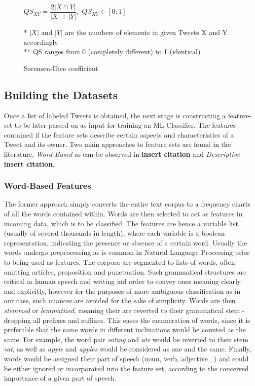 		\begin{figure}[h]
			\begin{center}
				\label{fig:sorenson_dice}
				$QS_{XY} = \dfrac{2|X\cap Y|}{|X|+|Y|},$ \hspace{10pt}  $QS_{XY} \in [0:1]$
				\par
			\end{center}
			{\small
				* $|X|$ and $|Y|$ are the numbers of elements in given Tweets X and Y accordingly 
				\\
				** QS ranges from 0 (completely different) to 1 (identical)
				\caption{S\o rensen-Dice coefficient}
			}
		\end{figure}
		
		\newpage
		
	\subsection{Building the Datasets}
	Once a list of labeled Tweets is obtained, the next stage is constructing a feature-set to be later passed on as input for training an ML Classifier. The features contained if the feature sets describe certain aspects and characteristics of a Tweet and its owner. Two main approaches to feature sets are found in the literature, \textit{Word-Based} as can be observed in \textbf{\color{red} insert citation} and \textit{Descriptive} \textbf{\color{red} insert citation}. 
	
		\subsubsection{Word-Based Features}
		The former approach simply converts the entire text corpus to a frequency charts of all the words contained within. Words are then selected to act as features in incoming data, which is to be classified. The features are hence a variable list (usually of several thousands in length), where each variable is a boolean representation, indicating the presence or absence of a certain word. Usually the words undergo preprocessing as is common in Natural Language Processing prior to being used as features. The corpora are segmented to lists of words, often omitting articles, proposition and punctuation. Such grammatical structures are critical in human speech and writing ind order to convey ones meaning clearly and explicitly, however for the purposes of more ambiguous classification as in our case, such nuances are avoided for the sake of simplicity. Words are then \textit{stemmed} or \textit{lemmatized}, meaning their are reverted to their grammatical stem - dropping all prefixes and suffixes. This eases the enumeration of words, since it is preferable that the same words in different inclinations would be counted as the same. For example, the word pair \textit{eating} and \textit{ate} would be reverted to their stem \textit{eat}, as well as \textit{apple} and \textit{apples} would be considered as one and the same. Finally, words would be assigned their part of speech (noun, verb, adjective ..) and could be either ignored or incorporated into the feature set, according to the conceived importance of a given part of speech.
		
